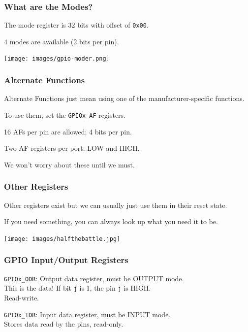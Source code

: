 \begin{frame}
\frametitle{What are the Modes?}

The mode register is 32 bits with offset of \texttt{0x00}. 

4 modes are available (2 bits per pin).

\begin{center}
	\texttt{[image: images/gpio-moder.png]}
\end{center}

\end{frame}


\begin{frame}
\frametitle{Alternate Functions}

Alternate Functions just mean using one of the manufacturer-specific functions.

To use them, set the \texttt{GPIOx\_AF} registers.

16 AFs per pin are allowed; 4 bits per pin.

Two AF registers per port: LOW and HIGH.

We won't worry about these until we must.

\end{frame}


\begin{frame}
\frametitle{Other Registers}

Other registers exist but we can usually just use them in their reset state.

If you need something, you can always look up what you need it to be.

\begin{center}
	\texttt{[image: images/halfthebattle.jpg]}
\end{center}


\end{frame}

\begin{frame}
\frametitle{GPIO Input/Output Registers}

\texttt{GPIOx\_ODR}: Output data register, must be OUTPUT mode.\\
\quad This is the data! If bit \texttt{j} is 1, the pin \texttt{j} is HIGH.\\
\quad Read-write.

\texttt{GPIOx\_IDR}: Input data register, must be INPUT mode.\\
\quad Stores data read by the pins, read-only.


\end{frame}



